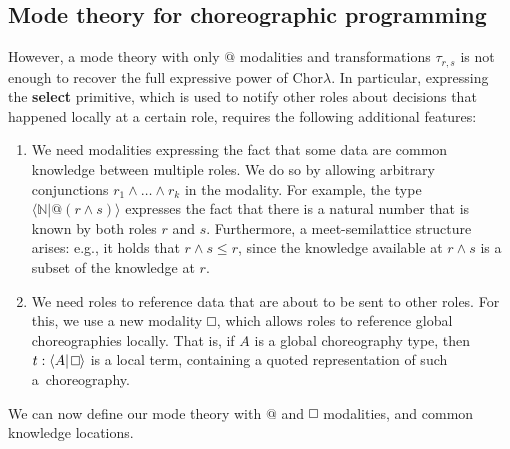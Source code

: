 \documentclass{scrartcl}
\renewcommand{\square}{\mathop{\mathchoice%
  {\tikz{\draw (0,0) rectangle (0.2cm,0.2cm);}}%
  {\tikz{\draw (0,0) rectangle (0.2cm,0.2cm);}}%
  {\tikz{\draw (0,0) rectangle (0.15cm,0.15cm);}}%
  {\tikz{\draw (0,0) rectangle (0.10cm,0.10cm);}}}}
\theoremstyle{definition}
\theoremstyle{plain}
\newcommand{\primitive}[1]{\textsf{\textbf{#1}}}
\begin{document}
\subsection{Mode theory for choreographic programming}
However, a mode theory with only $@$ modalities and transformations
$\tau_{r,s}$ is not enough to recover the full expressive power of
Chor$\lambda$. In particular, expressing the \primitive{select} primitive,
which is used to notify other roles about decisions that happened locally at
a certain role, requires the following additional features:
\begin{enumerate}
\item
  We need modalities expressing the fact that some data are common knowledge
  between multiple roles. We do so by allowing arbitrary conjunctions $r_1
  \land \ldots \land r_k$ in the modality. For example, the type $\langle
  \mathbb{N} | @(r\land s) \rangle$ expresses the fact that there is a natural
  number that is known by both roles $r$ and $s$. Furthermore, a
  meet-semilattice structure arises: e.g., it holds that $r \land s \leq r$,
  since the knowledge available at $r \land s$ is a subset of the knowledge at
  $r$.
\item
  We need roles to reference data that are about to be sent to other roles. For
  this, we use a new modality $\square$, which allows roles to reference global
  choreographies locally. That is, if $A$ is a global choreography type, then
  $t : \langle A | \square \rangle$ is a local term, containing a quoted
  representation of such a~choreography.
\end{enumerate}
We can now define our mode theory with $@$ and $\square$ modalities, and common
knowledge locations.
\end{document}
